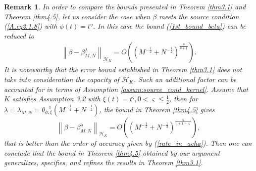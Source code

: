 \documentclass[USenglish]{article}
\newcommand{\norm}[1]{\left\lVert#1\right\rVert}
\newcommand{\lam}{\lambda}
\newcommand{\hk}{{\mathcal{H}_K}}
\newtheorem{remark}{Remark}
\begin{document}
\begin{remark}\label{rem_sec4}
    In order to compare the bounds presented in Theorem \ref{thm3.1} and Theorem \ref{thm4.5}, let us consider the case when $\beta$ meets the source condition (\ref{A.eq2.1.8}) with $\phi (t) = t^\eta$. 
     In this case the bound (\ref{1st_bound_beta}) can be reduced to 
	\begin{align}\label{rate_in_acha}
		\norm{\beta - \beta^\lam_{M,N}}_\hk  = O \left((M^{-\frac12} + N^{-\frac12})^\frac{\eta }{\eta +1}\right).
	\end{align}
	It is noteworthy that the error bound established in Theorem \ref{thm3.1} does not take into consideration the capacity of $\hk$. Such an additional factor can be accounted for in terms of Assumption \ref{assum:source_cond_kernel}. Assume that $K$ satisfies Assumption 3.2 with $\xi (t) = t^\varsigma, 0< \varsigma  \leq \frac12$, then for $\lam = \lam_{M,N} = \theta_{\phi,\xi}^{-1} (M^{-\frac12} + N^{-\frac12})$, the bound in Theorem \ref{thm4.5} gives  
	\[
	\norm{\beta - \beta^\lam_{M,N}}_\hk = O \left((M^{-\frac12} + N^{-\frac12})^\frac{\eta }{\eta +1 - \varsigma } \right),
	\]
 that is better than the order of accuracy given by (\ref{rate_in_acha}). Then one can conclude that the bound in Theorem \ref{thm4.5} obtained by our argument generalizes, specifies, and refines the results in Theorem \ref{thm3.1}. 
\end{remark}
\end{document}
